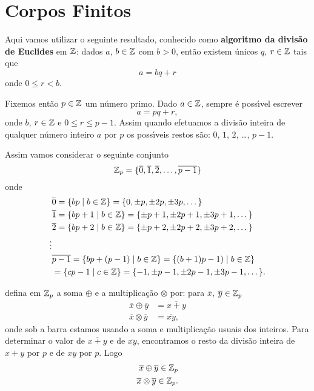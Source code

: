 
\section{Corpos Finitos}\label{sec:corpor_finitos}

Aqui vamos utilizar o seguinte resultado, conhecido como \textbf{algoritmo da divis\~ao de Euclides} em $\mathbb{Z}$: dados $a$, $b \in \mathbb{Z}$ com $b > 0$, ent\~ao existem \'unicos $q$, $r \in \mathbb{Z}$ tais que
\[
	a = bq + r
\]
onde $0 \le r < b$.


Fixemos ent\~ao $p \in \mathbb{Z}$ um n\'umero primo. Dado $a \in \mathbb{Z}$, sempre \'e poss{\'\i}vel escrever
\[
	a = pq + r,
\]
onde $b$, $r \in \mathbb{Z}$ e $0 \le r \le p - 1$. Assim quando efetuamos a divis\~ao inteira de qualquer n\'umero inteiro $a$ por $p$ os poss{\'\i}veis restos s\~ao: $0$, 
$1$, $2$, \dots, $p -1 $.

Assim vamos considerar o seguinte conjunto
\[
	\mathbb{Z}_p = \{\overline{0}, \overline{1}, \overline{2}, \dots, \overline{p - 1}\}
\]
onde
\begin{align*}
	&\overline{0} = \{bp \mid b \in \mathbb{Z}\} = \{0, \pm p, \pm 2p, \pm 3p, \dots\}\\
	&\overline{1} = \{bp + 1\mid b \in \mathbb{Z}\} = \{\pm p + 1, \pm 2p + 1, \pm 3p + 1, \dots\}\\
	&\overline{2} = \{bp + 2\mid b \in \mathbb{Z}\} = \{\pm p + 2, \pm 2p + 2, \pm 3p + 2, \dots\}\\
	\vdots\\
	&\overline{p - 1} = \{bp + (p - 1) \mid b \in \mathbb{Z}\} = \{(b + 1)p - 1) \mid b \in \mathbb{Z}\}\\ &= \{cp - 1 \mid c \in \mathbb{Z}\} = \{-1, \pm p - 1, \pm 2p - 1, \pm 3p - 1, \dots\}.
\end{align*}

defina em $\mathbb{Z}_p$ a soma $\oplus$ e a multiplica\c{c}\~ao $\otimes$ por: para $\overline{x}$, $\overline{y} \in \mathbb{Z}_p$
\begin{align*}
	\overline{x} \oplus \overline{y} &= \overline{x + y}\\
	\overline{x} \otimes \overline{y} &= \overline{xy},
\end{align*}
onde sob a barra estamos usando a soma e multiplica\c{c}\~ao usuais dos inteiros. Para determinar o valor de $\overline{x + y}$ e de $\overline{xy}$, encontramos o resto da divis\~ao inteira de $x + y$ por $p$ e de $xy$ por $p$. Logo
\begin{align*}
	\overline{x} \oplus \overline{y} \in \mathbb{Z}_p\\
	\overline{x} \otimes \overline{y} \in \mathbb{Z}_p.
\end{align*}

